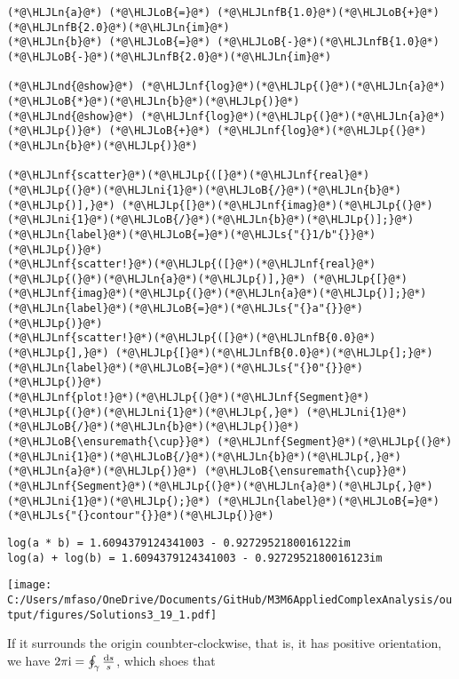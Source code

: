 \documentclass[12pt,a4paper]{article}
\newcommand{\HLJLn}[1]{#1}
\newcommand{\HLJLnd}[1]{\textcolor[RGB]{214,102,97}{#1}}
\newcommand{\HLJLnf}[1]{\textcolor[RGB]{66,102,213}{#1}}
\newcommand{\HLJLs}[1]{\textcolor[RGB]{201,61,57}{#1}}
\newcommand{\HLJLnfB}[1]{\textcolor[RGB]{59,151,46}{#1}}
\newcommand{\HLJLni}[1]{\textcolor[RGB]{59,151,46}{#1}}
\newcommand{\HLJLoB}[1]{\textcolor[RGB]{102,102,102}{\textbf{#1}}}
\newcommand{\HLJLp}[1]{#1}
\def\D{ {\rm d} }
\def\I{ {\rm i} }
\begin{document}
\begin{lstlisting}
(*@\HLJLn{a}@*) (*@\HLJLoB{=}@*) (*@\HLJLnfB{1.0}@*)(*@\HLJLoB{+}@*)(*@\HLJLnfB{2.0}@*)(*@\HLJLn{im}@*)
(*@\HLJLn{b}@*) (*@\HLJLoB{=}@*) (*@\HLJLoB{-}@*)(*@\HLJLnfB{1.0}@*)(*@\HLJLoB{-}@*)(*@\HLJLnfB{2.0}@*)(*@\HLJLn{im}@*)

(*@\HLJLnd{@show}@*) (*@\HLJLnf{log}@*)(*@\HLJLp{(}@*)(*@\HLJLn{a}@*)(*@\HLJLoB{*}@*)(*@\HLJLn{b}@*)(*@\HLJLp{)}@*)
(*@\HLJLnd{@show}@*) (*@\HLJLnf{log}@*)(*@\HLJLp{(}@*)(*@\HLJLn{a}@*)(*@\HLJLp{)}@*) (*@\HLJLoB{+}@*) (*@\HLJLnf{log}@*)(*@\HLJLp{(}@*)(*@\HLJLn{b}@*)(*@\HLJLp{)}@*)

(*@\HLJLnf{scatter}@*)(*@\HLJLp{([}@*)(*@\HLJLnf{real}@*)(*@\HLJLp{(}@*)(*@\HLJLni{1}@*)(*@\HLJLoB{/}@*)(*@\HLJLn{b}@*)(*@\HLJLp{)],}@*) (*@\HLJLp{[}@*)(*@\HLJLnf{imag}@*)(*@\HLJLp{(}@*)(*@\HLJLni{1}@*)(*@\HLJLoB{/}@*)(*@\HLJLn{b}@*)(*@\HLJLp{)];}@*) (*@\HLJLn{label}@*)(*@\HLJLoB{=}@*)(*@\HLJLs{"{}1/b"{}}@*)(*@\HLJLp{)}@*)
(*@\HLJLnf{scatter!}@*)(*@\HLJLp{([}@*)(*@\HLJLnf{real}@*)(*@\HLJLp{(}@*)(*@\HLJLn{a}@*)(*@\HLJLp{)],}@*) (*@\HLJLp{[}@*)(*@\HLJLnf{imag}@*)(*@\HLJLp{(}@*)(*@\HLJLn{a}@*)(*@\HLJLp{)];}@*) (*@\HLJLn{label}@*)(*@\HLJLoB{=}@*)(*@\HLJLs{"{}a"{}}@*)(*@\HLJLp{)}@*)
(*@\HLJLnf{scatter!}@*)(*@\HLJLp{([}@*)(*@\HLJLnfB{0.0}@*)(*@\HLJLp{],}@*) (*@\HLJLp{[}@*)(*@\HLJLnfB{0.0}@*)(*@\HLJLp{];}@*) (*@\HLJLn{label}@*)(*@\HLJLoB{=}@*)(*@\HLJLs{"{}0"{}}@*)(*@\HLJLp{)}@*)
(*@\HLJLnf{plot!}@*)(*@\HLJLp{(}@*)(*@\HLJLnf{Segment}@*)(*@\HLJLp{(}@*)(*@\HLJLni{1}@*)(*@\HLJLp{,}@*) (*@\HLJLni{1}@*)(*@\HLJLoB{/}@*)(*@\HLJLn{b}@*)(*@\HLJLp{)}@*) (*@\HLJLoB{\ensuremath{\cup}}@*) (*@\HLJLnf{Segment}@*)(*@\HLJLp{(}@*)(*@\HLJLni{1}@*)(*@\HLJLoB{/}@*)(*@\HLJLn{b}@*)(*@\HLJLp{,}@*) (*@\HLJLn{a}@*)(*@\HLJLp{)}@*) (*@\HLJLoB{\ensuremath{\cup}}@*) (*@\HLJLnf{Segment}@*)(*@\HLJLp{(}@*)(*@\HLJLn{a}@*)(*@\HLJLp{,}@*) (*@\HLJLni{1}@*)(*@\HLJLp{);}@*) (*@\HLJLn{label}@*)(*@\HLJLoB{=}@*)(*@\HLJLs{"{}contour"{}}@*)(*@\HLJLp{)}@*)
\end{lstlisting}

\begin{lstlisting}
log(a * b) = 1.6094379124341003 - 0.9272952180016122im
log(a) + log(b) = 1.6094379124341003 - 0.9272952180016123im
\end{lstlisting}

\texttt{[image: C:/Users/mfaso/OneDrive/Documents/GitHub/M3M6AppliedComplexAnalysis/output/figures/Solutions3\_19\_1.pdf]}

If it surrounds the origin counbter-clockwise, that is, it has positive orientation, we have $2\pi \I = \oint_\gamma {\D s \over s}$, which shoes that
\end{document}

